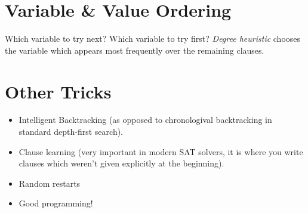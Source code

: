 \documentclass[11pt]{article}
\begin{document}
\section{Variable \& Value Ordering}
\label{sec:orgc13fba5}
Which variable to try next? Which variable to try first?
\emph{Degree heuristic} chooses the variable which appears most frequently over the remaining clauses.

\section{Other Tricks}
\label{sec:orgcf59b2b}
\begin{itemize}
\item Intelligent Backtracking (as opposed to chronologival backtracking in standard depth-first search).
\item Clause learning (very important in modern SAT solvers, it is where you write clauses which weren't given explicitly at the beginning).
\item Random restarts
\item Good programming!
\end{itemize}
\end{document}
